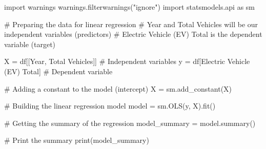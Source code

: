 \documentclass[
  letterpaper,
  DIV=11,
  numbers=noendperiod]{scrartcl}
\newenvironment{Shaded}{\begin{snugshade}}{\end{snugshade}}
\newcommand{\BuiltInTok}[1]{\textcolor[rgb]{0.00,0.23,0.31}{#1}}
\newcommand{\CommentTok}[1]{\textcolor[rgb]{0.37,0.37,0.37}{#1}}
\newcommand{\ImportTok}[1]{\textcolor[rgb]{0.00,0.46,0.62}{#1}}
\newcommand{\NormalTok}[1]{\textcolor[rgb]{0.00,0.23,0.31}{#1}}
\newcommand{\OperatorTok}[1]{\textcolor[rgb]{0.37,0.37,0.37}{#1}}
\newcommand{\StringTok}[1]{\textcolor[rgb]{0.13,0.47,0.30}{#1}}
\begin{document}
\begin{Shaded}
\begin{Highlighting}[]
\ImportTok{import}\NormalTok{ warnings}
\NormalTok{warnings.filterwarnings(}\StringTok{"ignore"}\NormalTok{)}
\ImportTok{import}\NormalTok{ statsmodels.api }\ImportTok{as}\NormalTok{ sm}

\CommentTok{\# Preparing the data for linear regression}
\CommentTok{\# \textquotesingle{}Year\textquotesingle{} and \textquotesingle{}Total Vehicles\textquotesingle{} will be our independent variables (predictors)}
\CommentTok{\# \textquotesingle{}Electric Vehicle (EV) Total\textquotesingle{} is the dependent variable (target)}

\NormalTok{X }\OperatorTok{=}\NormalTok{ df[[}\StringTok{\textquotesingle{}Year\textquotesingle{}}\NormalTok{, }\StringTok{\textquotesingle{}Total Vehicles\textquotesingle{}}\NormalTok{]]  }\CommentTok{\# Independent variables}
\NormalTok{y }\OperatorTok{=}\NormalTok{ df[}\StringTok{\textquotesingle{}Electric Vehicle (EV) Total\textquotesingle{}}\NormalTok{]  }\CommentTok{\# Dependent variable}

\CommentTok{\# Adding a constant to the model (intercept)}
\NormalTok{X }\OperatorTok{=}\NormalTok{ sm.add\_constant(X)}

\CommentTok{\# Building the linear regression model}
\NormalTok{model }\OperatorTok{=}\NormalTok{ sm.OLS(y, X).fit()}

\CommentTok{\# Getting the summary of the regression}
\NormalTok{model\_summary }\OperatorTok{=}\NormalTok{ model.summary()}

\CommentTok{\# Print the summary}
\BuiltInTok{print}\NormalTok{(model\_summary)}
\end{Highlighting}
\end{Shaded}
\end{document}
